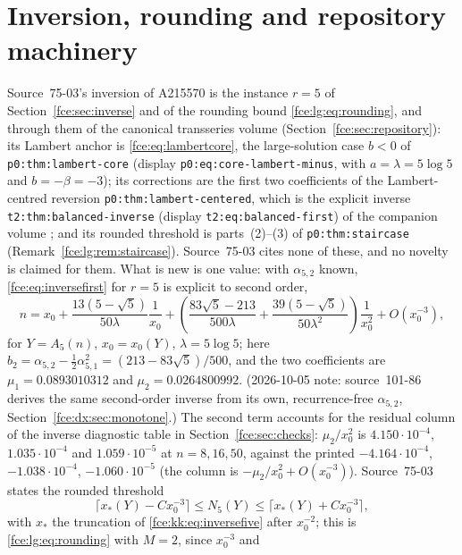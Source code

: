 \documentclass[11pt,a4paper]{article}
\numberwithin{equation}{section}
\theoremstyle{definition}\newtheorem{definition}[theorem]{Definition}
\theoremstyle{remark}\newtheorem{remark}[theorem]{Remark}
\begin{document}
\section{Inversion, rounding and repository machinery}\label{fce:kk:sec:inverse}
Source~75-03's inversion of A215570 is the instance $r=5$ of
Section~\ref{fce:sec:inverse} and of the rounding bound
\eqref{fce:lg:eq:rounding}, and through them of the canonical transseries
volume (Section~\ref{fce:sec:repository}): its Lambert anchor is
\eqref{fce:eq:lambertcore}, the large-solution case $b<0$ of
\texttt{p0:thm:lambert-core} (display \texttt{p0:eq:core-lambert-minus},
with $a=\lambda=5\log5$ and $b=-\beta=-3$); its corrections are the first two
coefficients of the Lambert-centred reversion
\texttt{p0:thm:lambert-centered}, which is the explicit inverse
\texttt{t2:thm:balanced-inverse} (display \texttt{t2:eq:balanced-first}) of
the companion volume
;
and its rounded threshold is parts~(2)--(3) of \texttt{p0:thm:staircase}
(Remark~\ref{fce:lg:rem:staircase}). Source~75-03 cites none of these, and
no novelty is claimed for them. What is new is one value: with
$\alpha_{5,2}$ known, \eqref{fce:eq:inversefirst} for $r=5$ is explicit to
second order,
\begin{equation}\label{fce:kk:eq:inversefive}
 n=x_0+\frac{13(5-\sqrt5)}{50\lambda}\frac1{x_0}
 +\left(\frac{83\sqrt5-213}{500\lambda}+\frac{39(5-\sqrt5)}{50\lambda^2}\right)\frac1{x_0^2}
 +O(x_0^{-3}),
\end{equation}
for $Y=A_5(n)$, $x_0=x_0(Y)$, $\lambda=5\log5$; here
$b_2=\alpha_{5,2}-\tfrac12\alpha_{5,1}^2=(213-83\sqrt5)/500$, and the two
coefficients are $\mu_1=0.0893010312$ and $\mu_2=0.0264800992$.
(2026-10-05 note: source~101-86 derives the same second-order inverse from its own,
recurrence-free $\alpha_{5,2}$, Section~\ref{fce:dx:sec:monotone}.) The second
term accounts for the residual column of the inverse diagnostic table in
Section~\ref{fce:sec:checks}: $\mu_2/x_0^2$ is $4.150\cdot10^{-4}$,
$1.035\cdot10^{-4}$ and $1.059\cdot10^{-5}$ at $n=8,16,50$, against the
printed $-4.164\cdot10^{-4}$, $-1.038\cdot10^{-4}$, $-1.060\cdot10^{-5}$
(the column is $-\mu_2/x_0^2+O(x_0^{-3})$). Source~75-03 states the rounded
threshold
\[
 \bigl\lceil x_*(Y)-Cx_0^{-3}\bigr\rceil\le N_5(Y)\le\bigl\lceil x_*(Y)+Cx_0^{-3}\bigr\rceil,
\]
with $x_*$ the truncation of \eqref{fce:kk:eq:inversefive} after $x_0^{-2}$;
this is \eqref{fce:lg:eq:rounding} with $M=2$, since $x_0^{-3}$ and
\end{document}
